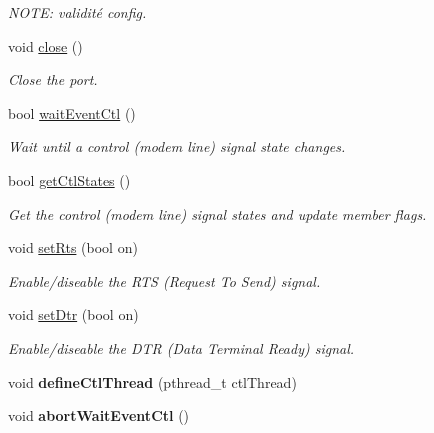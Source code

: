 \begin{DoxyCompactItemize}
\begin{DoxyCompactList}\small\item\em NOTE: validité config. \end{DoxyCompactList}\item 
void \hyperlink{classmdt_serial_port_posix_a29df8d6b7c74bd7e3bf8513987bdd2a2}{close} ()
\begin{DoxyCompactList}\small\item\em Close the port. \end{DoxyCompactList}\item 
bool \hyperlink{classmdt_serial_port_posix_a8ec213863c6eacfc8d3079aadc9ef43b}{waitEventCtl} ()
\begin{DoxyCompactList}\small\item\em Wait until a control (modem line) signal state changes. \end{DoxyCompactList}\item 
bool \hyperlink{classmdt_serial_port_posix_a849ce720a56af921c0ecf9ba08744acc}{getCtlStates} ()
\begin{DoxyCompactList}\small\item\em Get the control (modem line) signal states and update member flags. \end{DoxyCompactList}\item 
void \hyperlink{classmdt_serial_port_posix_a3d27cec6098549cdba68465b8c5d4480}{setRts} (bool on)
\begin{DoxyCompactList}\small\item\em Enable/diseable the RTS (Request To Send) signal. \end{DoxyCompactList}\item 
void \hyperlink{classmdt_serial_port_posix_a0d489a938cba216ab43d3ae591689676}{setDtr} (bool on)
\begin{DoxyCompactList}\small\item\em Enable/diseable the DTR (Data Terminal Ready) signal. \end{DoxyCompactList}\item 
\hypertarget{classmdt_serial_port_posix_ae840ab8d5628bdf05d8d88cc5495c2ad}{
void {\bfseries defineCtlThread} (pthread\_\-t ctlThread)}
\label{classmdt_serial_port_posix_ae840ab8d5628bdf05d8d88cc5495c2ad}

\item 
\hypertarget{classmdt_serial_port_posix_afe5b70aead00c0ad0107c436e9b8ffbf}{
void {\bfseries abortWaitEventCtl} ()}
\label{classmdt_serial_port_posix_afe5b70aead00c0ad0107c436e9b8ffbf}

\end{DoxyCompactItemize}


